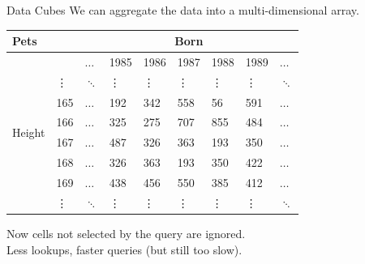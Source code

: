 \documentclass{beamer}
\theoremstyle{definition}
\theoremstyle{definition}
\begin{document}
\begin{frame}{Data Cubes}
    We can aggregate the data into a multi-dimensional array.\cite{Gray96}

    \begin{table}[h]\footnotesize
        \begin{tabular} { | l | l | l | l | l | l | l | l | l |}
        \hline
        \textbf{Pets} & & \multicolumn{7}{|c|}{Born} \\ \hline
        & & $\hdots$ & 1985 & 1986 & 1987 & 1988 & 1989 & $\hdots$ \\ \hline
        \multirow{6}{*}{Height}
        & \vdots & $\ddots$ & \vdots & \vdots & \vdots & \vdots & \vdots & $\ddots$ \\
        & 165 & $\hdots$ & 192 & 342 & 558 & 56 & 591 & $\hdots$ \\
        & 166 & $\hdots$ & 325 & 275 & 707 & 855 & 484 & $\hdots$ \\
        & 167 & $\hdots$ & 487 & 326 & 363 & 193 & 350 & $\hdots$ \\
        & 168 & $\hdots$ & 326 & 363 & 193 & 350 & 422 & $\hdots$ \\
        & 169 & $\hdots$ & 438 & 456 & 550 & 385 & 412 & $\hdots$ \\
        & \vdots & $\ddots$ & \vdots & \vdots & \vdots & \vdots & \vdots & $\ddots$ \\
        \hline
        \end{tabular}
    \end{table}
    \pause
    Now cells not selected by the query are ignored. \\
    Less lookups, faster queries (but still too slow).
\end{frame}
\end{document}
